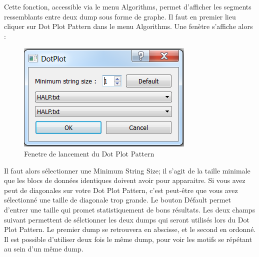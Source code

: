 Cette fonction, accessible via le menu Algorithms, permet d'afficher les segments ressemblants entre deux dump sous forme de graphe. Il faut en premier lieu cliquer sur Dot Plot Pattern dans le menu Algorithms. Une fenètre s'affiche alors :

\begin{figure}[!h]
  \begin{center}
  \includegraphics[width=\textwidth]{dotplotdialog.png}
  \caption{Fenetre de lancement du Dot Plot Pattern}
  \label{dotplotdialog}
  \end{center}
\end{figure}

Il faut alors sélectionner une Minimum String Size; il s'agit de la taille minimale que les blocs de données identiques doivent avoir pour apparaitre. Si vous avez peut de diagonales sur votre Dot Plot Pattern, c'est peut-être que vous avez sélectionné une taille de diagonale trop grande. Le bouton Défault permet d'entrer une taille qui promet statistiquement de bons résultats.
Les deux champs suivant permettent de sélctionner les deux dumps qui seront utilisés lors du Dot Plot Pattern. Le premier dump se retrouvera en abscisse, et le second en ordonné. Il est possible d'utiliser deux fois le même dump, pour voir les motifs se répétant au sein d'un même dump.

